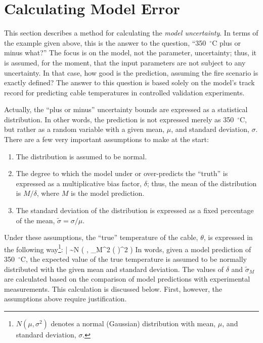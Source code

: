 \section{Calculating Model Error}

This section describes a method for calculating the {\em model uncertainty}. In terms of the example given above, this
is the answer to the question, ``350~$^\circ$C plus or minus what?'' The focus is on the model, not the parameter, uncertainty;
thus, it is assumed, for the moment, that the input parameters are not subject to any uncertainty.
In that case, how good is the prediction, assuming the fire scenario is exactly defined? The answer to this question is based solely on
the model's track record for predicting cable temperatures in controlled validation experiments.

Actually, the ``plus or minus'' uncertainty bounds are expressed as a statistical distribution. In other words, the
prediction is not expressed merely as 350~$^\circ$C, but rather as a random variable with a given mean, $\mu$, and standard
deviation, $\sigma$. There are a few very important assumptions to make at the start:
\begin{enumerate}
\item The distribution is assumed to be normal.
\item The degree to which the model under or over-predicts the ``truth'' is expressed as a multiplicative bias factor, $\delta$; thus,
the mean of the distribution is $M/\delta$, where $M$ is the model prediction.
\item The standard deviation of the distribution is expressed as a fixed percentage of the mean,
$\widetilde{\sigma}=\sigma/\mu$.
\end{enumerate}
Under these assumptions, the ``true'' temperature of the cable, $\theta$, is expressed in the
following way\footnote{$N(\mu,\sigma^2)$ denotes a normal (Gaussian) distribution
with mean, $\mu$, and standard deviation, $\sigma$.}:
\be
   \theta \; |  \sim N \left(  \; , \; \widetilde{\sigma}_M^2
   \left(  \right)^2 \right) \label{truthexample}
\ee
In words, given a model prediction of 350~$^\circ$C, the expected value of the true temperature is assumed to be normally distributed
with the given mean and standard deviation. The values of $\delta$ and $\widetilde{\sigma}_M$ are calculated based on the
comparison of model predictions with experimental measurements. This calculation is discussed below. First, however, the
assumptions above require justification.

